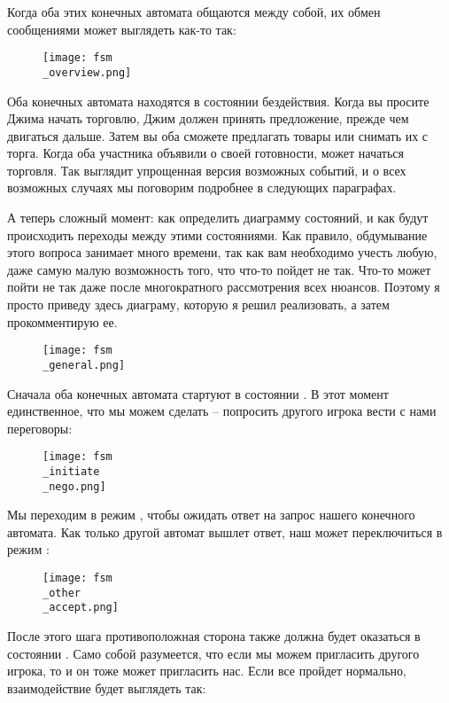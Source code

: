 Когда оба этих конечных автомата общаются между собой, их обмен сообщениями может выглядеть как-то так:

\begin{figure}[h!]
    \centering
    \texttt{[image: fsm\\\_overview.png]}
\end{figure}

Оба конечных автомата находятся в состоянии бездействия.
Когда вы просите Джима начать торговлю, Джим должен принять предложение, прежде чем двигаться дальше.
Затем вы оба сможете предлагать товары или снимать их с торга.
Когда оба участника объявили о своей готовности, может начаться торговля.
Так выглядит упрощенная версия возможных событий, и о всех возможных случаях мы поговорим подробнее в следующих параграфах.

А теперь сложный момент: как определить диаграмму состояний, и как будут происходить переходы между этими состояниями.
Как правило, обдумывание этого вопроса занимает много времени, так как вам необходимо учесть любую, даже самую малую возможность того, что что-то пойдет не так.
Что-то может пойти не так даже после многократного рассмотрения всех нюансов.
Поэтому я просто приведу здесь диаграму, которую я решил реализовать, а затем прокомментирую ее.

\begin{figure}[h!]
    \centering
    \texttt{[image: fsm\\\_general.png]}
\end{figure}

Сначала оба конечных автомата стартуют в состоянии .
В этот момент единственное, что мы можем сделать \--- попросить другого игрока вести с нами переговоры:

\begin{figure}[h!]
    \centering
    \texttt{[image: fsm\\\_initiate\\\_nego.png]}
\end{figure}

Мы переходим в режим , чтобы ожидать ответ на запрос нашего конечного автомата.
Как только другой автомат вышлет ответ, наш может переключиться в режим :

\begin{figure}[h!]
    \centering
    \texttt{[image: fsm\\\_other\\\_accept.png]}
\end{figure}

После этого шага противоположная сторона также должна будет оказаться в состоянии .
Само собой разумеется, что если мы можем пригласить другого игрока, то и он тоже может пригласить нас.
Если все пройдет нормально, взаимодействие будет выглядеть так:

